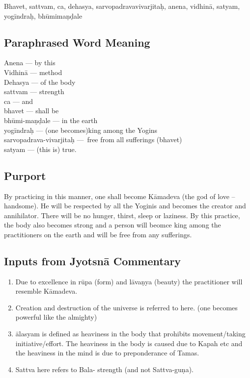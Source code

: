 Bhavet, sattvam, ca, dehasya, sarvopadravavivarjitaḥ, anena, vidhinā, satyam, yogīndraḥ, bhūmimaṇḍale

\subsection*{Paraphrased Word Meaning}


\begin{multicols}{2}
Anena --- by this\\
Vidhinā --- method\\ 
Dehasya --- of the body \\
sattvam --- strength \\
ca --- and \\
bhavet --- shall be \\
bhūmi-maṇḍale --- in the earth \\
yogīndraḥ --- (one becomes)king among the Yogins\\
sarvopadrava-vivarjitaḥ --- free from all sufferings (bhavet) \\
satyam --- (this is) true.
\end{multicols}

\subsection*{Purport}
\vspace{-5pt}

By practicing in this manner, one shall become Kāmadeva (the god of love – handsome). He will be respected by all the Yoginis and becomes the creator and annihilator. There will be no hunger, thirst, sleep or laziness. By this practice, the body also becomes strong and a person will beomce king among the practitioners on the earth and will be free from any sufferings.

\subsection*{Inputs from Jyotsnā Commentary}
\vspace{-5pt}

\begin{enumerate}
\itemsep=0pt
\item Due to excellence in rūpa (form) and lāvaṇya (beauty) the practitioner  will resemble Kāmadeva. 
\item Creation and destruction of the universe is referred to here. (one becomes powerful like the almighty)
\item ālasyam is defined as heaviness in the body that prohibits movement/taking initiative/effort. The heaviness in the body is caused due to Kapah etc and the heaviness in the mind is due to preponderance of Tamas. 
\item Sattva here refers to Bala- strength (and not Sattva-guṇa). 
\end{enumerate}

